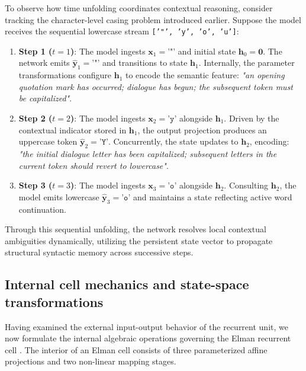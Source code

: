 \documentclass[../../main.tex]{subfiles}
\begin{document}
To observe how time unfolding coordinates contextual reasoning, consider tracking the character-level casing problem introduced earlier. Suppose the model receives the sequential lowercase stream \texttt{['"', 'y', 'o', 'u']}:
\begin{enumerate}
    \item \textbf{Step 1 ($t=1$)}: The model ingests $\mathbf{x}_1 = \texttt{'"'}$ and initial state $\mathbf{h}_0 = \mathbf{0}$. The network emits $\hat{\mathbf{y}}_1 = \texttt{'"'}$ and transitions to state $\mathbf{h}_1$. Internally, the parameter transformations configure $\mathbf{h}_1$ to encode the semantic feature: \textit{"an opening quotation mark has occurred; dialogue has begun; the subsequent token must be capitalized"}.
    \item \textbf{Step 2 ($t=2$)}: The model ingests $\mathbf{x}_2 = \texttt{'y'}$ alongside $\mathbf{h}_1$. Driven by the contextual indicator stored in $\mathbf{h}_1$, the output projection produces an uppercase token $\hat{\mathbf{y}}_2 = \texttt{'Y'}$. Concurrently, the state updates to $\mathbf{h}_2$, encoding: \textit{"the initial dialogue letter has been capitalized; subsequent letters in the current token should revert to lowercase"}.
    \item \textbf{Step 3 ($t=3$)}: The model ingests $\mathbf{x}_3 = \texttt{'o'}$ alongside $\mathbf{h}_2$. Consulting $\mathbf{h}_2$, the model emits lowercase $\hat{\mathbf{y}}_3 = \texttt{'o'}$ and maintains a state reflecting active word continuation.
\end{enumerate}

Through this sequential unfolding, the network resolves local contextual ambiguities dynamically, utilizing the persistent state vector to propagate structural syntactic memory across successive steps.

\subsection{Internal cell mechanics and state-space transformations}
\label{subsec:rnn_internal_cell_mechanics}

Having examined the external input-output behavior of the recurrent unit, we now formulate the internal algebraic operations governing the Elman recurrent cell \citep{elman1990}. The interior of an Elman cell consists of three parameterized affine projections and two non-linear mapping stages.
\end{document}
